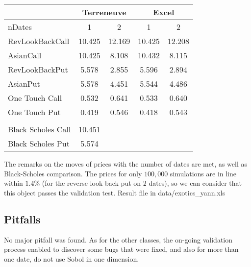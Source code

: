 \begin{center}
\begin{tabular}{|l|l|l|l|l|}
\cline{2-5}
\multicolumn{1}{l|}{} & \multicolumn{2}{c|}{\textbf{Terreneuve}} & \multicolumn{2}{c|}{\textbf{Excel}} \\ 
\hline
nDates & \multicolumn{1}{c|}{1} & \multicolumn{1}{c|}{2} & \multicolumn{1}{c|}{1} & \multicolumn{1}{c|}{2} \\ 
\hline
RevLookBackCall & \multicolumn{1}{c|}{10.425} & \multicolumn{1}{c|}{12.169} & \multicolumn{1}{c|}{10.425} & \multicolumn{1}{c|}{12.208} \\ 
\hline
AsianCall & \multicolumn{1}{c|}{10.425} & \multicolumn{1}{c|}{8.108} & \multicolumn{1}{c|}{10.432} & \multicolumn{1}{c|}{8.115} \\ 
\hline
RevLookBackPut & \multicolumn{1}{c|}{5.578} & \multicolumn{1}{c|}{2.855} & \multicolumn{1}{c|}{5.596} & \multicolumn{1}{c|}{2.894} \\ 
\hline
AsianPut & \multicolumn{1}{c|}{5.578} & \multicolumn{1}{c|}{4.451} & \multicolumn{1}{c|}{5.544} & \multicolumn{1}{c|}{4.486} \\ 
\hline
One Touch Call & \multicolumn{1}{c|}{0.532} & \multicolumn{1}{c|}{0.641} & \multicolumn{1}{c|}{0.533} & \multicolumn{1}{c|}{0.640} \\ 
\hline
One Touch Put & \multicolumn{1}{c|}{0.419} & \multicolumn{1}{c|}{0.546} & \multicolumn{1}{c|}{0.418} & \multicolumn{1}{c|}{0.543} \\ 
\hline
\multicolumn{1}{l}{} & \multicolumn{1}{c}{} & \multicolumn{1}{c}{} & \multicolumn{1}{c}{} & \multicolumn{1}{c}{} \\ 
\cline{1-2}
Black Scholes Call & \multicolumn{1}{c|}{10.451} & \multicolumn{1}{c}{} & \multicolumn{1}{c}{} & \multicolumn{1}{c}{} \\ 
\cline{1-2}
Black Scholes Put & \multicolumn{1}{c|}{5.574} & \multicolumn{1}{c}{} & \multicolumn{1}{c}{} & \multicolumn{1}{c}{} \\ 
\cline{1-2}
\end{tabular}\end{center}

The remarks on the moves of prices with the number of dates are met, as well as Black-Scholes comparison. The prices for only $100,000$ simulations are in line within $1.4\%$ (for the reverse look back put on 2 dates), so we can consider that this object passes the validation test. Result file in data/exotics\_yann.xls


\subsection{Pitfalls}

No major pitfall was found. As for the other classes, the on-going validation process enabled to discover some bugs that were fixed, and also for more than one date, do not use Sobol in one dimension.
